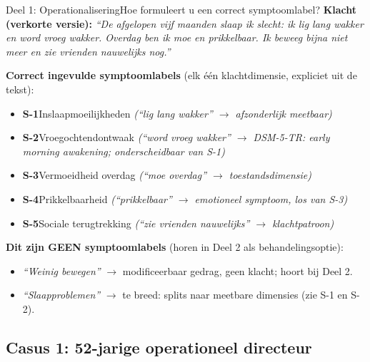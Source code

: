 \documentclass[11pt,a4paper]{article}
\begin{document}
\begin{voorbeeldbox}{Deel 1: Operationalisering}{Hoe formuleert u een correct symptoomlabel?}
\small
\textbf{Klacht (verkorte versie):} \textit{``De afgelopen vijf maanden slaap ik slecht:
ik lig lang wakker en word vroeg wakker. Overdag ben ik moe en prikkelbaar. Ik beweeg
bijna niet meer en zie vrienden nauwelijks nog.''}

\medskip
\textbf{Correct ingevulde symptoomlabels} (elk één klachtdimensie, expliciet uit de tekst):
\begin{itemize}[topsep=2pt,itemsep=1pt]
\item \textbf{S-1}\enspace Inslaapmoeilijkheden
  \hfill\textit{(``lig lang wakker'' $\rightarrow$ afzonderlijk meetbaar)}
\item \textbf{S-2}\enspace Vroegochtendontwaak
  \hfill\textit{(``word vroeg wakker'' $\rightarrow$ DSM-5-TR: early morning awakening; onderscheidbaar van S-1)}
\item \textbf{S-3}\enspace Vermoeidheid overdag
  \hfill\textit{(``moe overdag'' $\rightarrow$ toestandsdimensie)}
\item \textbf{S-4}\enspace Prikkelbaarheid
  \hfill\textit{(``prikkelbaar'' $\rightarrow$ emotioneel symptoom, los van S-3)}
\item \textbf{S-5}\enspace Sociale terugtrekking
  \hfill\textit{(``zie vrienden nauwelijks'' $\rightarrow$ klachtpatroon)}
\end{itemize}

\medskip
\textbf{\color{StrongRed}Dit zijn GEEN symptoomlabels} (horen in Deel 2 als behandelingsoptie):
\begin{itemize}[topsep=1pt,itemsep=0pt]
\item \textit{``Weinig bewegen''} $\rightarrow$ modificeerbaar gedrag, geen klacht; hoort bij Deel 2.
\item \textit{``Slaapproblemen''} $\rightarrow$ te breed: splits naar meetbare dimensies (zie S-1 en S-2).
\end{itemize}
\end{voorbeeldbox}

\vspace{0.5em}

\newpage

\subsection*{Casus 1: 52-jarige operationeel directeur}
\end{document}
